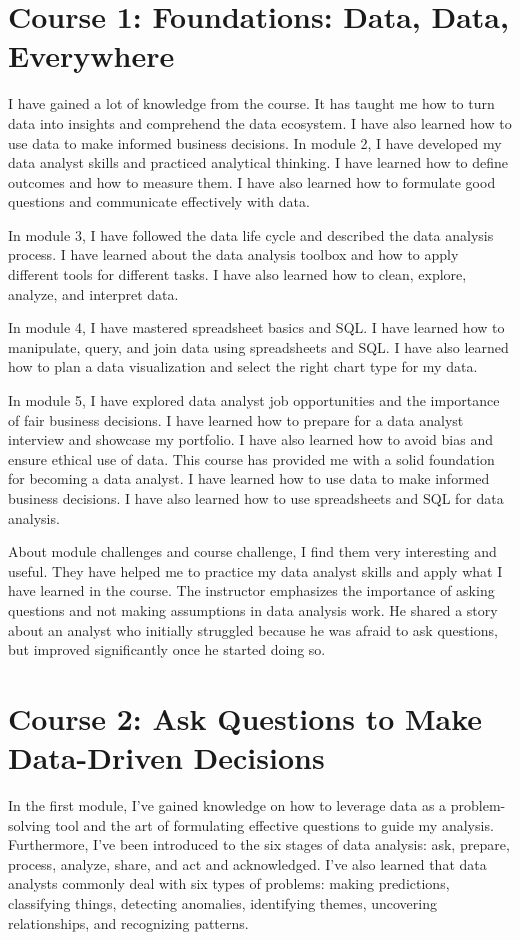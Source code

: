 \documentclass[]{article}
\begin{document}
\section{Course 1: Foundations: Data, Data, Everywhere}
I have gained a lot of knowledge from the course. It has taught me how to turn data into insights and comprehend the data ecosystem. I have also learned how to use data to make informed business decisions.
In module 2, I have developed my data analyst skills and practiced analytical thinking. I have learned how to define outcomes and how to measure them. I have also learned how to formulate good questions and communicate effectively with data.\par
In module 3, I have followed the data life cycle and described the data analysis process. I have learned about the data analysis toolbox and how to apply different tools for different tasks. I have also learned how to clean, explore, analyze, and interpret data.\par
In module 4, I have mastered spreadsheet basics and SQL. I have learned how to manipulate, query, and join data using spreadsheets and SQL. I have also learned how to plan a data visualization and select the right chart type for my data.\par
In module 5, I have explored data analyst job opportunities and the importance of fair business decisions. I have learned how to prepare for a data analyst interview and showcase my portfolio. I have also learned how to avoid bias and ensure ethical use of data. This course has provided me with a solid foundation for becoming a data analyst. I have learned how to use data to make informed business decisions. I have also learned how to use spreadsheets and SQL for data analysis.\par
About module challenges and course challenge, I find them very interesting and useful. They have helped me to practice my data analyst skills and apply what I have learned in the course. The instructor emphasizes the importance of asking questions and not making assumptions in data analysis work. He shared a story about an analyst who initially struggled because he was afraid to ask questions, but improved significantly once he started doing so.

\section{Course 2: Ask Questions to Make Data-Driven Decisions}
In the first module, I've gained knowledge on how to leverage data as a problem-solving tool and the art of formulating effective questions to guide my analysis. Furthermore, I've been introduced to the six stages of data analysis: ask, prepare, process, analyze, share, and act and acknowledged. I've also learned that data analysts commonly deal with six types of problems: making predictions, classifying things, detecting anomalies, identifying themes, uncovering relationships, and recognizing patterns.\par
\end{document}
